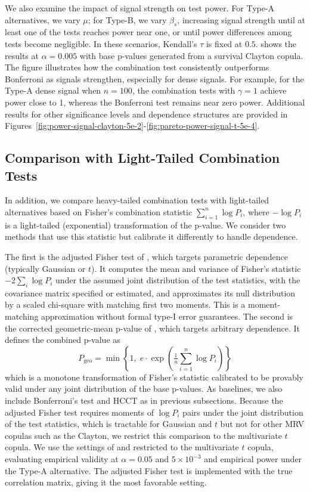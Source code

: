 \documentclass[12pt]{article}
\theoremstyle{plain}
\theoremstyle{plain}
\theoremstyle{definition}
\begin{document}
We also examine the impact of signal strength on test power. For Type-A alternatives, we vary $\mu$; for Type-B, we vary $\beta_s$, increasing signal strength until at least one of the tests reaches power near one, or until power differences among tests become negligible. In these scenarios, Kendall's $\tau$ is fixed at $0.5$.  shows the results at $\alpha = 0.005$ with base p-values generated from a survival Clayton copula. The figure illustrates how the combination test consistently outperforms Bonferroni as signals strengthen, especially for dense signals. For example, for the Type-A dense signal when $n = 100$, the combination tests with $\gamma = 1$ achieve power close to 1, whereas the Bonferroni test remains near zero power. Additional results for other significance levels and dependence structures are provided in Figures~\ref{fig:power-signal-clayton-5e-2}-\ref{fig:pareto-power-signal-t-5e-4}.


\subsection{Comparison with Light-Tailed Combination Tests}
\label{subsec:comp-with-light-tail-test}
In addition, we compare heavy-tailed combination tests with light-tailed alternatives based on Fisher's combination statistic $\sum_{i=1}^n \log P_i$, where $-\log P_i$ is a light-tailed (exponential) transformation of the p-value. We consider two methods that use this statistic but calibrate it differently to handle dependence.


The first is the adjusted Fisher test of \cite{kost2002combining}, which targets parametric dependence (typically Gaussian or $t$). It computes the mean and variance of Fisher's statistic  $-2\sum_i \log P_i$
under the assumed joint distribution of the test statistics, with the covariance matrix specified or estimated, and approximates its null distribution by a scaled chi-square with matching first two moments. This is a moment-matching approximation without formal type-I error guarantees. The second is the corrected geometric-mean p-value of \cite{vovk2020combining}, which targets arbitrary dependence. It defines the combined p-value as
$$P_{\mathrm{geo}} = \min\left\{1, \; e \cdot \exp\left(\tfrac{1}{n}\sum_{i=1}^n \log P_i\right)\right\}$$
which is a monotone transformation of Fisher's statistic calibrated to be provably valid under any joint distribution of the base 
p-values. As baselines, we also include Bonferroni's test and HCCT \citep{liu2025heavily} as in previous subsections.
Because the adjusted Fisher test requires moments of $\log P_i$
pairs under the joint distribution of the test statistics, which is tractable for Gaussian and $t$ but not for other MRV copulas such as the Clayton, we restrict this comparison to the multivariate $t$ copula. 
We use the settings of  and  restricted to the multivariate $t$ copula, evaluating empirical validity at $\alpha = 0.05$ and 
$5 \times 10^{-3}$ and empirical power under the Type-A alternative. The adjusted Fisher test is implemented with the true correlation matrix, giving it the most favorable setting.
\end{document}
